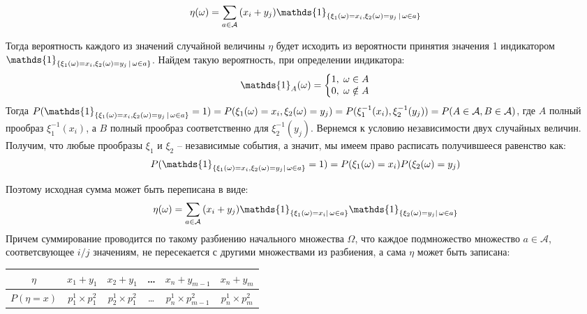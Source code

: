 \documentclass{article}
\makeatletter
\newenvironment{sistema}%
{\left\lbrace\begin{array}{@{}l@{}}}%
{\end{array}\right.}
\makeatother
\begin{document}
\begin{multicols}{2}
    $$\eta(\omega) = \sum_{a \in \mathcal{A}}{(x_i + y_j) \mathds{1}_{\{\xi_1(\omega) = x_i, \xi_2(\omega) = y_j \hspace{0.05cm} | \hspace{0.05cm} \omega \in a\}}}$$

    Тогда вероятность каждого из значений случайной величины $\eta$ будет исходить из вероятности принятия значения 1 индикатором $\mathds{1}_{\{\xi_1(\omega) = x_i, \xi_2(\omega) = y_j \hspace{0.05cm} | \hspace{0.05cm} \omega \in a\}}$. Найдем такую вероятность, при определении индикатора:
    \[
      \mathds{1}_{A}(\omega) =
      \begin{sistema}
        1, \hspace{0.1cm} \omega \in A\\
        0, \hspace{0.1cm} \omega \notin A 
      \end{sistema} 
    \]
    Тогда $P(\mathds{1}_{\{\xi_1(\omega) = x_i, \xi_2(\omega) = y_j \hspace{0.05cm} | \hspace{0.05cm} \omega \in a\}} = 1) =\\ 
    P(\xi_1(\omega) = x_i, \xi_2(\omega) = y_j)= P(\xi_1^{-1}(x_i), \xi_2^{-1}(y_j))=\\ 
    P(A \in \mathcal{A}, B \in \mathcal{A})$, где  $A$ полный прообраз $\xi_1^{-1}(x_i)$, а $B$ полный прообраз соответственно для $\xi_2^{-1}(y_j)$. Вернемся к условию независимости двух случайных величин. Получим, что любые прообразы $\xi_1$ и $\xi_2$ -- независимые события, а значит, мы имеем право расписать получившееся равенство как:
    $$P(\mathds{1}_{\{\xi_1(\omega) = x_i, \xi_2(\omega) = y_j | \hspace{0.05cm} \omega \in a\}} = 1) = P(\xi_1(\omega) = x_i)P(\xi_2(\omega) = y_j)$$

    Поэтому исходная сумма может быть переписана в виде:
    $$\eta(\omega) = \sum_{a \in \mathcal{A}}{(x_i + y_j) \mathds{1}_{\{\xi_1(\omega) = x_i | \hspace{0.05cm} \omega \in a\}} \mathds{1}_{\{\xi_2(\omega) = y_j | \hspace{0.05cm} \omega \in a\}}}$$
    Причем суммирование проводится по такому разбиению начального множества $\Omega$, что каждое подмножество множество $a \in \mathcal{A}$, соответсвующее $i/j$  значениям, не пересекается с другими множествами из разбиения, а сама $\eta$ может быть записана:
    \begin{center}
        \begin{tabular}{ c|c|c|c|c|c } 
             $\eta$ & $x_1 + y_1$ & $x_2 + y_1$ & \ldots & $x_n + y_{m-1}$ & $x_n + y_m$\\
             \hline
             $P(\eta = x)$ & $p^1_1 \times p^2_1$ & $p^1_2 \times p^2_1$ & \ldots & $p^1_n \times p^2_{m-1}$ & $p^1_n \times p^2_m$\\
        \end{tabular}
    \end{center}


\end{multicols}
\end{document}
